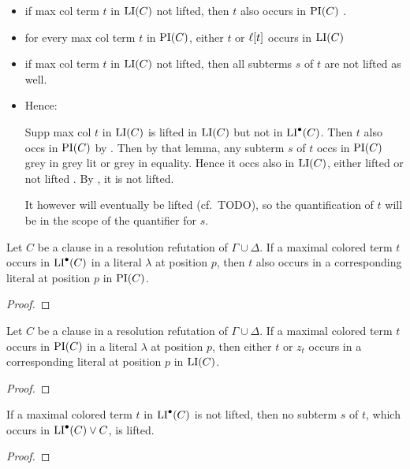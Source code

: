 \documentclass[,%
	draft=false,%
	numbers=noendperiod
	12pt,
	a4paper,
	oneside,%
	openany,
]{memoir}
\begin{document}
\begin{itemize}
	\item if max col term $t$ in $\operatorname{LI}(C)$ not lifted, then $t$ also occurs in $\operatorname{PI}(C)$ .
	\item for every max col term $t$ in $\operatorname{PI}(C)$, either $t$ or $\ell[t]$ occurs in $\operatorname{LI}(C)$
	\item if max col term $t$ in $\operatorname{LI}(C)$ not lifted, then all subterms $s$ of $t$ are not lifted as well.
	\item Hence: 

		Supp max col $t$ in $\operatorname{LI}(C)$ is lifted in $\operatorname{LI}(C)$ but not in $\operatorname{LI}^\bullet(C)$. \newline
		Then $t$ also occs in $\operatorname{PI}(C)$ by . \newline
		Then by that lemma, any subterm $s$ of $t$ occs in $\operatorname{PI}(C)$ grey in grey lit or grey in equality.
		Hence it occs also in $\operatorname{LI}(C)$, either lifted or not lifted  .\newline
		By , it is not lifted.

		It however will eventually be lifted (cf.\ TODO), so the quantification of $t$ will be in the scope of the quantifier for $s$.
\end{itemize}

\begin{clemma}
	\label{lemma:pi_li_1}
	Let $C$ be a clause in a resolution refutation of $\Gamma \cup \Delta$.
	If a maximal colored term $t$ occurs in $\operatorname{LI}^\bullet(C)$ in a literal $\lambda$ at position $p$, 
	then $t$ also occurs in a corresponding literal at position $p$ in $\operatorname{PI}(C)$.
\end{clemma}
\begin{proof}
	\mytodo{}
\end{proof}

\begin{clemma}
	\label{lemma:pi_li_2}
	Let $C$ be a clause in a resolution refutation of $\Gamma \cup \Delta$.
	If a maximal colored term $t$ occurs in $\operatorname{PI}(C)$ in a literal $\lambda$ at position $p$, 
	then either $t$ or $z_t$ occurs in a corresponding literal at position $p$ in $\operatorname{LI}(C)$. 
\end{clemma}
\begin{proof}
	\mytodo{}
\end{proof}

\begin{clemma}
	\label{lemma:pi_li_3}
	If a maximal colored term $t$ in $\operatorname{LI}^\bullet(C)$ is not lifted, then no subterm $s$ of $t$, which occurs in $\operatorname{LI}^\bullet(C) \lor C$, is lifted.
\end{clemma}
\begin{proof}

\end{proof}
\end{document}

